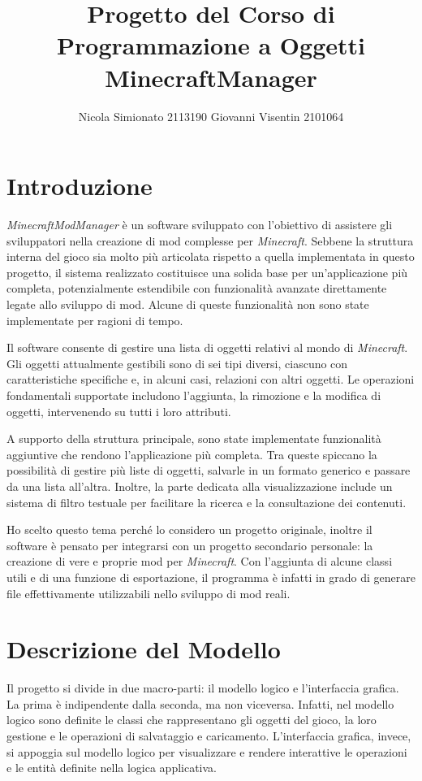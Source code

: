 \documentclass[a4paper,12pt]{article}
\title{\textbf{Progetto del Corso di Programmazione a Oggetti}\\\large MinecraftManager}
\author{
  Nicola Simionato 2113190
  Giovanni Visentin 2101064
}
\begin{document}
\maketitle

\section{Introduzione}

\textit{MinecraftModManager} è un software sviluppato con l'obiettivo di assistere gli sviluppatori nella creazione di mod complesse per \textit{Minecraft}. Sebbene la struttura interna del gioco sia molto più articolata rispetto a quella implementata in questo progetto, il sistema realizzato costituisce una solida base per un’applicazione più completa, potenzialmente estendibile con funzionalità avanzate direttamente legate allo sviluppo di mod. Alcune di queste funzionalità non sono state implementate per ragioni di tempo.

Il software consente di gestire una lista di oggetti relativi al mondo di \textit{Minecraft}. Gli oggetti attualmente gestibili sono di sei tipi diversi, ciascuno con caratteristiche specifiche e, in alcuni casi, relazioni con altri oggetti. Le operazioni fondamentali supportate includono l'aggiunta, la rimozione e la modifica di oggetti, intervenendo su tutti i loro attributi.

A supporto della struttura principale, sono state implementate funzionalità aggiuntive che rendono l’applicazione più completa. Tra queste spiccano la possibilità di gestire più liste di oggetti, salvarle in un formato generico e passare da una lista all’altra. Inoltre, la parte dedicata alla visualizzazione include un sistema di filtro testuale per facilitare la ricerca e la consultazione dei contenuti.

Ho scelto questo tema perché lo considero un progetto originale, inoltre il software è pensato per integrarsi con un progetto secondario personale: la creazione di vere e proprie mod per \textit{Minecraft}. Con l’aggiunta di alcune classi utili e di una funzione di esportazione, il programma è infatti in grado di generare file effettivamente utilizzabili nello sviluppo di mod reali.

\section{Descrizione del Modello}

Il progetto si divide in due macro-parti: il modello logico e l'interfaccia grafica.  
La prima è indipendente dalla seconda, ma non viceversa. Infatti, nel modello logico sono definite le classi che rappresentano gli oggetti del gioco, la loro gestione e le operazioni di salvataggio e caricamento.  
L'interfaccia grafica, invece, si appoggia sul modello logico per visualizzare e rendere interattive le operazioni e le entità definite nella logica applicativa.
\end{document}
